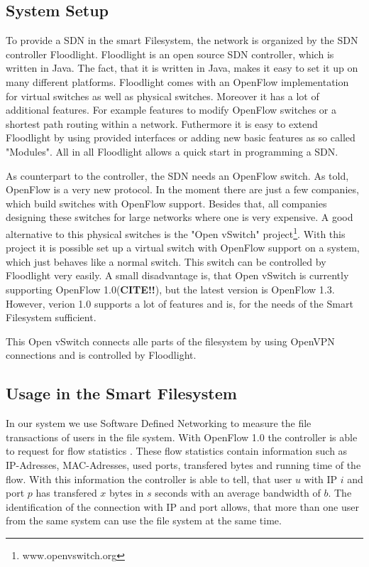 \subsection{System Setup}
To provide a SDN in the smart Filesystem, the network is organized by the SDN controller Floodlight\cite{flood}. Floodlight is an open source SDN controller, which is written in Java. The fact, that it is written in Java, makes it easy to set it up on many different platforms. Floodlight comes with an OpenFlow implementation for virtual switches as well as physical switches. Moreover it has a lot of additional features. For example features to modify OpenFlow switches or a shortest path routing within a network. Futhermore it is easy to extend Floodlight by using provided interfaces or adding new basic features as so called "Modules". All in all Floodlight allows a quick start in programming a SDN.

As counterpart to the controller, the SDN needs an OpenFlow switch. As told, OpenFlow is a very new protocol. In the moment there are just a few companies, which build switches with OpenFlow support. Besides that, all companies designing these switches for large networks where one is very expensive. A good alternative to this physical switches is the "Open vSwitch" project\footnote{www.openvswitch.org}. With this project it is possible set up a virtual switch with OpenFlow support on a system, which just behaves like a normal switch. This switch can be controlled by Floodlight very easily. A small disadvantage is, that Open vSwitch is currently supporting OpenFlow 1.0(\textbf{CITE!!}), but the latest version is OpenFlow 1.3. However, verion 1.0 supports a lot of features and is, for the needs of the Smart Filesystem sufficient.

This Open vSwitch connects alle parts of the filesystem by using OpenVPN connections and is controlled by Floodlight.     
   
\subsection{Usage in the Smart Filesystem}
In our system we use Software Defined Networking to measure the file transactions of users in the file system. With OpenFlow 1.0 the controller is able to request for flow statistics \cite[P. 31]{ofspec}. These flow statistics contain information such as IP-Adresses, MAC-Adresses, used ports, transfered bytes and running time of the flow. With this information the controller is able to tell, that user $u$ with IP $i$ and port $p$ has transfered $x$ bytes in $s$ seconds with an average bandwidth of $b$. The identification of the connection with IP and port allows, that more than one user from the same system can use the file system at the same time.

